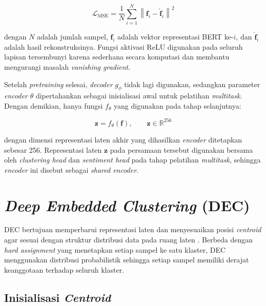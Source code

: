 \begin{equation}
    \mathcal{L}_{\text{MSE}} = \frac{1}{N} \sum_{i=1}^{N}
    \left\| \mathbf{f}_i - \hat{\mathbf{f}}_i \right\|^2
    \label{eq:mse}
\end{equation}

\noindent dengan $N$ adalah jumlah sampel, $\mathbf{f}_i$ adalah vektor
representasi BERT ke-$i$, dan $\hat{\mathbf{f}}_i$ adalah hasil
rekonstruksinya. Fungsi aktivasi ReLU digunakan pada seluruh lapisan
tersembunyi karena sederhana secara komputasi dan membantu mengurangi
masalah \textit{vanishing gradient}.

Setelah \textit{pretraining} selesai, \textit{decoder} $g_\phi$ tidak
lagi digunakan, sedangkan parameter \textit{encoder} $\theta$
dipertahankan sebagai inisialisasi awal untuk pelatihan
\textit{multitask}. Dengan demikian, hanya fungsi $f_\theta$ yang
digunakan pada tahap selanjutnya:

\begin{equation}
    \mathbf{z} = f_\theta(\mathbf{f}), \qquad \mathbf{z} \in \mathbb{R}^{256}
    \label{eq:shared_encoder_final}
\end{equation}

\noindent dengan dimensi representasi laten akhir yang dihasilkan
\textit{encoder} ditetapkan sebesar 256. Representasi laten $\mathbf{z}$
pada persamaan tersebut digunakan bersama oleh \textit{clustering head}
dan \textit{sentiment head} pada tahap pelatihan \textit{multitask},
sehingga \textit{encoder} ini disebut sebagai \textit{shared encoder}.

\section{\textit{Deep Embedded Clustering} (DEC)}
\label{sec:dec}

DEC bertujuan memperbarui representasi laten dan menyesuaikan posisi
\textit{centroid} agar sesuai dengan struktur distribusi data pada ruang
laten \parencite{xie2016unsupervised}. Berbeda dengan \textit{hard
assignment} yang menetapkan setiap sampel ke satu klaster, DEC
menggunakan distribusi probabilistik sehingga setiap sampel memiliki
derajat keanggotaan terhadap seluruh klaster.

\subsection{Inisialisasi \textit{Centroid}}

